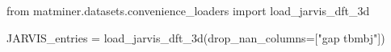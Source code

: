 from matminer.datasets.convenience_loaders import load_jarvis_dft_3d

JARVIS_entries = load_jarvis_dft_3d(drop_nan_columns=["gap tbmbj"])
